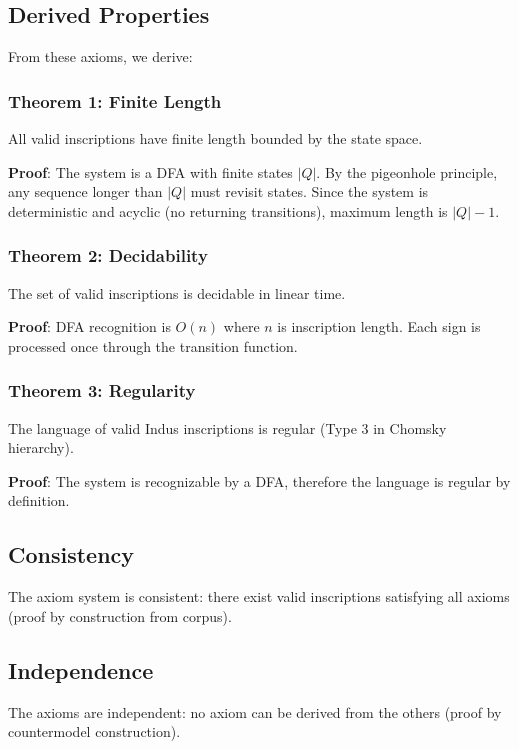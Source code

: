 \subsection{Derived Properties}

From these axioms, we derive:

\subsubsection{Theorem 1: Finite Length}
All valid inscriptions have finite length bounded by the state space.

\textbf{Proof}: The system is a DFA with finite states $|Q|$. By the pigeonhole principle, any sequence longer than $|Q|$ must revisit states. Since the system is deterministic and acyclic (no returning transitions), maximum length is $|Q| - 1$.

\subsubsection{Theorem 2: Decidability}
The set of valid inscriptions is decidable in linear time.

\textbf{Proof}: DFA recognition is $O(n)$ where $n$ is inscription length. Each sign is processed once through the transition function.

\subsubsection{Theorem 3: Regularity}
The language of valid Indus inscriptions is regular (Type 3 in Chomsky hierarchy).

\textbf{Proof}: The system is recognizable by a DFA, therefore the language is regular by definition.

\subsection{Consistency}

The axiom system is consistent: there exist valid inscriptions satisfying all axioms (proof by construction from corpus).

\subsection{Independence}

The axioms are independent: no axiom can be derived from the others (proof by countermodel construction).

